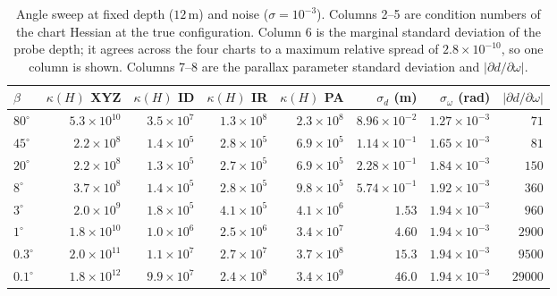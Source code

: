 \documentclass[11pt,a4paper]{article}
\theoremstyle{definition}
\theoremstyle{remark}
\begin{document}
\begin{table}[!tb]
\centering
\caption{Angle sweep at fixed depth ($12$\,m) and noise ($\sigma=10^{-3}$). Columns 2--5 are condition numbers of the chart Hessian at the true configuration. Column 6 is the marginal standard deviation of the probe depth; it agrees across the four charts to a maximum relative spread of $2.8\times10^{-10}$, so one column is shown. Columns 7--8 are the parallax parameter standard deviation and $|\partial d/\partial\omega|$.}
\label{tab:sweep}
\small
\begin{tabular}{lrrrrrrr}
\toprule
$\beta$ & $\kappa(H)$ XYZ & $\kappa(H)$ ID & $\kappa(H)$ IR & $\kappa(H)$ PA & $\sigma_d$ (m) & $\sigma_\omega$ (rad) & $|\partial d/\partial\omega|$\\
\midrule
$80^\circ$ & $5.3\times10^{10}$ & $3.5\times10^{7}$ & $1.3\times10^{8}$ & $2.3\times10^{8}$ & $8.96\times10^{-2}$ & $1.27\times10^{-3}$ & $71$\\
$45^\circ$ & $2.2\times10^{8}$ & $1.4\times10^{5}$ & $2.8\times10^{5}$ & $6.9\times10^{5}$ & $1.14\times10^{-1}$ & $1.65\times10^{-3}$ & $81$\\
$20^\circ$ & $2.2\times10^{8}$ & $1.3\times10^{5}$ & $2.7\times10^{5}$ & $6.9\times10^{5}$ & $2.28\times10^{-1}$ & $1.84\times10^{-3}$ & $150$\\
$8^\circ$ & $3.7\times10^{8}$ & $1.4\times10^{5}$ & $2.8\times10^{5}$ & $9.8\times10^{5}$ & $5.74\times10^{-1}$ & $1.92\times10^{-3}$ & $360$\\
$3^\circ$ & $2.0\times10^{9}$ & $1.8\times10^{5}$ & $4.1\times10^{5}$ & $4.1\times10^{6}$ & $1.53$ & $1.94\times10^{-3}$ & $960$\\
$1^\circ$ & $1.8\times10^{10}$ & $1.0\times10^{6}$ & $2.5\times10^{6}$ & $3.4\times10^{7}$ & $4.60$ & $1.94\times10^{-3}$ & $2900$\\
$0.3^\circ$ & $2.0\times10^{11}$ & $1.1\times10^{7}$ & $2.7\times10^{7}$ & $3.7\times10^{8}$ & $15.3$ & $1.94\times10^{-3}$ & $9500$\\
$0.1^\circ$ & $1.8\times10^{12}$ & $9.9\times10^{7}$ & $2.4\times10^{8}$ & $3.4\times10^{9}$ & $46.0$ & $1.94\times10^{-3}$ & $29000$\\
\bottomrule
\end{tabular}
\end{table}
\end{document}
